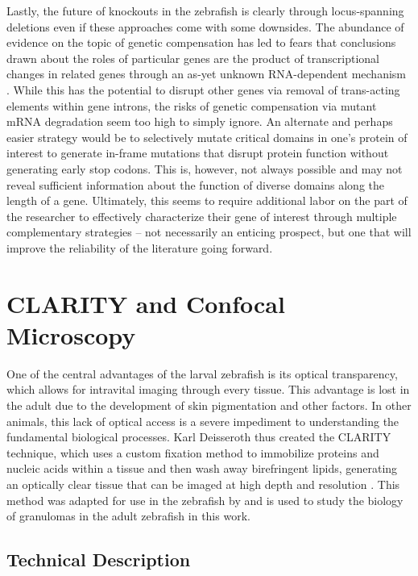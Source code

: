 Lastly, the future of knockouts in the zebrafish is clearly through locus-spanning deletions even if these approaches come with some downsides. The abundance of evidence on the topic of genetic compensation has led to fears that conclusions drawn about the roles of particular genes are the product of transcriptional changes in related genes through an as-yet unknown RNA-dependent mechanism \citep{Rossi2015, ElBrolosy2019}. While this has the potential to disrupt other genes via removal of trans-acting elements within gene introns, the risks of genetic compensation via mutant mRNA degradation seem too high to simply ignore. An alternate and perhaps easier strategy would be to selectively mutate critical domains in one's protein of interest to generate in-frame mutations that disrupt protein function without generating early stop codons. This is, however, not always possible and may not reveal sufficient information about the function of diverse domains along the length of a gene. Ultimately, this seems to require additional labor on the part of the researcher to effectively characterize their gene of interest through multiple complementary strategies -- not necessarily an enticing prospect, but one that will improve the reliability of the literature going forward.

\section{CLARITY and Confocal Microscopy}\label{clarity}

One of the central advantages of the larval zebrafish is its optical transparency, which allows for intravital imaging through every tissue. This advantage is lost in the adult due to the development of skin pigmentation and other factors. In other animals, this lack of optical access is a severe impediment to understanding the fundamental biological processes. Karl Deisseroth thus created the CLARITY technique, which uses a custom fixation method to immobilize proteins and nucleic acids within a tissue and then wash away birefringent lipids, generating an optically clear tissue that can be imaged at high depth and resolution \citep{Chung2013, Yang2014d}. This method was adapted for use in the zebrafish by \citet{Cronan2015} and is used to study the biology of granulomas in the adult zebrafish in this work.

\subsection{Technical Description}\label{clardet}

